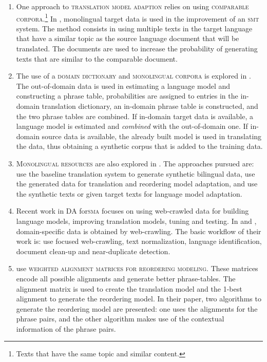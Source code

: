 \documentclass[output=paper]{LSP/langsci}
\begin{document}
\begin{enumerate}
\item 
One approach to \textsc{translation model adaption} relies on using \textsc{comparable corpora}.\footnote{Texts that have the same topic and similar content.} In \citet{SnoverEtAl2008}, monolingual target data is used in the improvement of an \textsc{smt} system. The method consists in using multiple texts in the target language that have a similar topic as the source language document that will be translated. The documents are used to increase the probability of generating texts that are similar to the comparable document. 
\item 
The use of a \textsc{domain dictionary} and \textsc{monolingual corpora} is explored in \citet{WuEtAl2008}. The out-of-domain data is used in estimating a language model and constructing a phrase table, probabilities are assigned to entries in the in-domain translation dictionary, an in-domain phrase table is constructed, and the two phrase tables are combined. If in-domain target data is available, a language model is estimated and \textit{combined} with the out-of-domain one. If in-domain source data is available, the already built model is used in translating the data, thus obtaining a synthetic corpus that is added to the training data. 
\item 
\textsc{Monolingual resources} are also explored in \citet{Bertoldi2009}. The approaches pursued are: use the baseline translation system to generate synthetic bilingual data, use the generated data for translation and reordering model adaptation, and use the synthetic texts or given target texts for language model adaptation. 
\item 
Recent work in \textsc{DA} for\textsc{sma} focuses on using web-crawled data for building language models, improving translation models, tuning and testing. In \citet{PecinaEtAl2011} and \citet{PecinaEtAl2012}, domain-specific data is obtained by web-crawling. The basic workflow of their work is: use focused web-crawling, text normalization, language identification, document clean-up and near-duplicate detection. 
\item 
\citet{LingEtAl2011} use \textsc{weighted alignment matrices for reordering modeling.} These matrices encode all possible alignments and generate better phrase-tables. The alignment matrix is used to create the translation model and the 1-best alignment to generate the reordering model. In their paper, two algorithms to generate the reordering model are presented: one uses the alignments for the phrase pairs, and the other algorithm makes use of the contextual information of the phrase pairs.
\end{enumerate}
\end{document}
